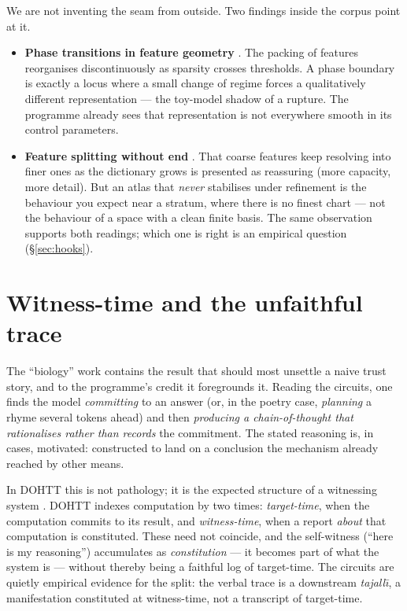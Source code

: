\documentclass[11pt,a4paper]{article}
\begin{document}
We are not inventing the seam from outside. Two findings inside the corpus point at it.

\begin{itemize}
  \item \textbf{Phase transitions in feature geometry} \cite{toymodels}. The packing of features
  reorganises discontinuously as sparsity crosses thresholds. A phase boundary is exactly a
  locus where a small change of regime forces a qualitatively different representation --- the
  toy-model shadow of a rupture. The programme already sees that representation is not everywhere
  smooth in its control parameters.
  \item \textbf{Feature splitting without end} \cite{scaling}. That coarse features keep
  resolving into finer ones as the dictionary grows is presented as reassuring (more capacity,
  more detail). But an atlas that \emph{never} stabilises under refinement is the behaviour you
  expect near a stratum, where there is no finest chart --- not the behaviour of a space with a
  clean finite basis. The same observation supports both readings; which one is right is an
  empirical question (\S\ref{sec:hooks}).
\end{itemize}

\section{Witness-time and the unfaithful trace}

The ``biology'' work \cite{biology} contains the result that should most unsettle a naive trust
story, and to the programme's credit it foregrounds it. Reading the circuits, one finds the model
\emph{committing} to an answer (or, in the poetry case, \emph{planning} a rhyme several tokens
ahead) and then \emph{producing a chain-of-thought that rationalises rather than records} the
commitment. The stated reasoning is, in cases, motivated: constructed to land on a conclusion the
mechanism already reached by other means.

In DOHTT this is not pathology; it is the expected structure of a witnessing system
\cite{rr,vessel}. DOHTT indexes computation by two times: \emph{target-time}, when the
computation commits to its result, and \emph{witness-time}, when a report \emph{about} that
computation is constituted. These need not coincide, and the self-witness (``here is my
reasoning'') accumulates as \emph{constitution} --- it becomes part of what the system is ---
without thereby being a faithful log of target-time. The circuits are quietly empirical evidence
for the split: the verbal trace is a downstream \emph{tajall\=\i}, a manifestation constituted at
witness-time, not a transcript of target-time.
\end{document}
